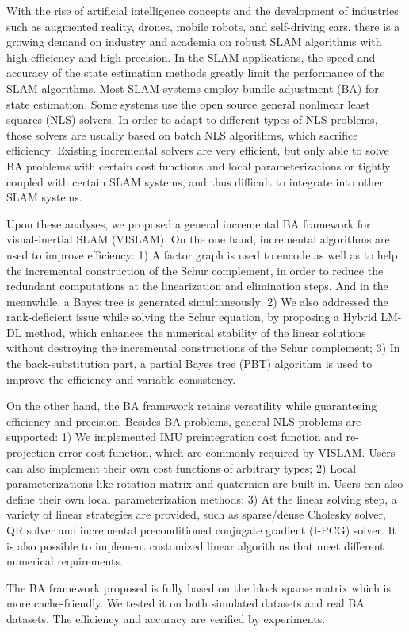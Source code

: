 \begin{englishabstract}
With the rise of artificial intelligence concepts and the development of industries such as augmented reality, drones, mobile robots, and self-driving cars, there is a growing demand on industry and academia on robust SLAM algorithms with high efficiency and high precision. In the SLAM applications, the speed and accuracy of the state estimation methods greatly limit the performance of the SLAM algorithms. Most SLAM systems employ bundle adjustment (BA) for state estimation. Some systems use the open source general nonlinear least squares (NLS) solvers. In order to adapt to different types of NLS problems, those solvers are usually based on batch NLS algorithms, which sacrifice efficiency; Existing incremental solvers are very efficient, but only able to solve BA problems with certain cost functions and local parameterizations or tightly coupled with certain SLAM systems, and thus difficult to integrate into other SLAM systems.

Upon these analyses, we proposed a general incremental BA framework for visual-inertial SLAM (VISLAM). On the one hand, incremental algorithms are used to improve efficiency: 1) A factor graph is used to encode as well as to help the incremental construction of the Schur complement, in order to reduce the redundant computations at the linearization and elimination steps. And in the meanwhile, a Bayes tree is generated simultaneously; 2) We also addressed the rank-deficient issue while solving the Schur equation, by proposing a Hybrid LM-DL method, which enhances the numerical stability of the linear solutions without destroying the incremental constructions of the Schur complement; 3) In the back-substitution part, a partial Bayes tree (PBT) algorithm is used to improve the efficiency and variable consistency.

On the other hand, the BA framework retains versatility while guaranteeing efficiency and precision. Besides BA problems, general NLS problems are supported: 1) We implemented IMU preintegration cost function and re-projection error cost function, which are commonly required by VISLAM. Users can also implement their own cost functions of arbitrary types; 2) Local parameterizations like rotation matrix and quaternion are built-in. Users can also define their own local parameterization methods; 3) At the linear solving step, a variety of linear strategies are provided, such as sparse/dense Cholesky solver, QR solver and incremental preconditioned conjugate gradient (I-PCG) solver. It is also possible to implement customized linear algorithms that meet different numerical requirements.

The BA framework proposed is fully based on the block sparse matrix which is more cache-friendly. We tested it on both simulated datasets and real BA datasets. The efficiency and accuracy are verified by experiments.

\end{englishabstract}

